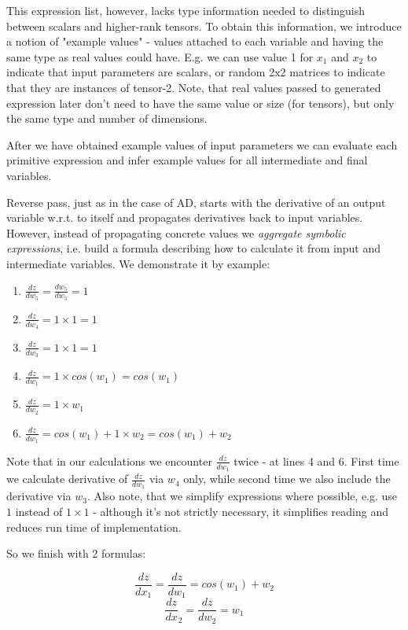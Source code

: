 \documentclass[conference]{IEEEtran}
\begin{document}
This expression list, however, lacks type information needed to
distinguish between scalars and higher-rank tensors. To obtain this
information, we introduce a notion of "example values" - values
attached to each variable and having the same type as real values
could have. E.g. we can use value 1 for $x_1$ and $x_2$ to indicate
that input parameters are scalars, or random 2x2 matrices to indicate
that they are instances of tensor-2. Note, that real values passed to
generated expression later don't need to have the same value or size
(for tensors), but only the same type and number of dimensions.

After we have obtained example values of input parameters we can
evaluate each primitive expression and infer example values for all
intermediate and final variables.

Reverse pass, just as in the case of AD, starts with the derivative of
an output variable w.r.t. to itself and propagates derivatives back to
input variables. However, instead of propagating concrete values we
\textit{aggregate symbolic expressions}, i.e. build a formula
describing how to calculate it from input and intermediate
variables. We demonstrate it by example:

\begin{enumerate}
\item $\frac{dz}{dw_5} = \frac{dw_5}{dw_5} = 1$
\item $\frac{dz}{dw_4} = 1 \times 1 = 1$
\item $\frac{dz}{dw_3} = 1 \times 1 = 1$
\item $\frac{dz}{dw_1} = 1 \times cos(w_1) = cos(w_1)$
\item $\frac{dz}{dw_2} = 1 \times w_1$
\item $\frac{dz}{dw_1} = cos(w_1) + 1 \times w_2 = cos(w_1) + w_2$
\end{enumerate}

Note that in our calculations we encounter $\frac{dz}{dw_1}$ twice -
at lines 4 and 6. First time we calculate derivative of
$\frac{dz}{dw_1}$ via $w_4$ only, while second time we also include
the derivative via $w_3$. Also note, that we simplify expressions
where possible, e.g. use $1$ instead of $1 \times 1$ - although it's
not strictly necessary, it simplifies reading and reduces run time of
implementation.

So we finish with 2 formulas:

$$\frac{dz}{dx_1} = \frac{dz}{dw_1} = cos(w_1) + w_2$$
$$\frac{dz}{dx}_2 = \frac{dz}{dw_2} = w_1$$
\end{document}
